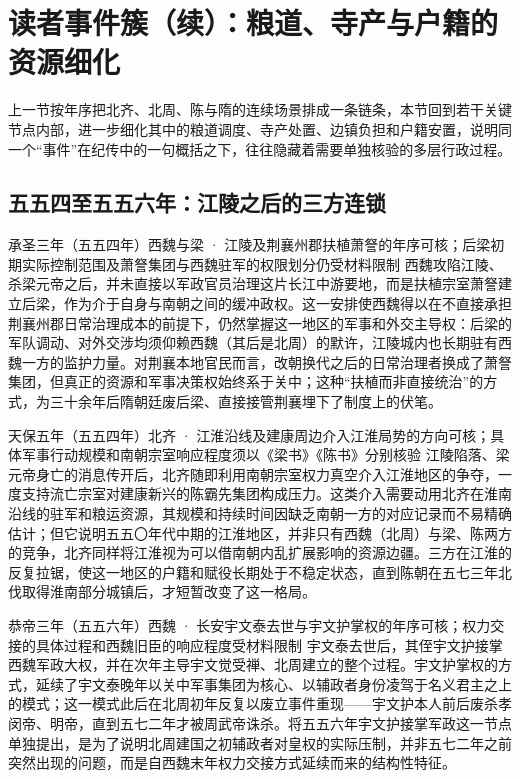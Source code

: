\section{读者事件簇（续）：粮道、寺产与户籍的资源细化}

上一节按年序把北齐、北周、陈与隋的连续场景排成一条链条，本节回到若干关键节点内部，进一步细化其中的粮道调度、寺产处置、边镇负担和户籍安置，说明同一个“事件”在纪传中的一句概括之下，往往隐藏着需要单独核验的多层行政过程。

\subsection{五五四至五五六年：江陵之后的三方连锁}

\begin{event}{}{承圣三年（五五四年）}{西魏与梁 · 江陵及荆襄州郡}{扶植萧詧的年序可核；后梁初期实际控制范围及萧詧集团与西魏驻军的权限划分仍受材料限制}
西魏攻陷江陵、杀梁元帝之后，并未直接以军政官员治理这片长江中游要地，而是扶植宗室萧詧建立后梁，作为介于自身与南朝之间的缓冲政权。这一安排使西魏得以在不直接承担荆襄州郡日常治理成本的前提下，仍然掌握这一地区的军事和外交主导权：后梁的军队调动、对外交涉均须仰赖西魏（其后是北周）的默许，江陵城内也长期驻有西魏一方的监护力量。对荆襄本地官民而言，改朝换代之后的日常治理者换成了萧詧集团，但真正的资源和军事决策权始终系于关中；这种“扶植而非直接统治”的方式，为三十余年后隋朝廷废后梁、直接接管荆襄埋下了制度上的伏笔。
\end{event}

\begin{event}{}{天保五年（五五四年）}{北齐 · 江淮沿线及建康周边}{介入江淮局势的方向可核；具体军事行动规模和南朝宗室响应程度须以《梁书》《陈书》分别核验}
江陵陷落、梁元帝身亡的消息传开后，北齐随即利用南朝宗室权力真空介入江淮地区的争夺，一度支持流亡宗室对建康新兴的陈霸先集团构成压力。这类介入需要动用北齐在淮南沿线的驻军和粮运资源，其规模和持续时间因缺乏南朝一方的对应记录而不易精确估计；但它说明五五〇年代中期的江淮地区，并非只有西魏（北周）与梁、陈两方的竞争，北齐同样将江淮视为可以借南朝内乱扩展影响的资源边疆。三方在江淮的反复拉锯，使这一地区的户籍和赋役长期处于不稳定状态，直到陈朝在五七三年北伐取得淮南部分城镇后，才短暂改变了这一格局。
\end{event}

\begin{event}{}{恭帝三年（五五六年）}{西魏 · 长安}{宇文泰去世与宇文护掌权的年序可核；权力交接的具体过程和西魏旧臣的响应程度受材料限制}
宇文泰去世后，其侄宇文护接掌西魏军政大权，并在次年主导宇文觉受禅、北周建立的整个过程。宇文护掌权的方式，延续了宇文泰晚年以关中军事集团为核心、以辅政者身份凌驾于名义君主之上的模式；这一模式此后在北周初年反复以废立事件重现——宇文护本人前后废杀孝闵帝、明帝，直到五七二年才被周武帝诛杀。将五五六年宇文护接掌军政这一节点单独提出，是为了说明北周建国之初辅政者对皇权的实际压制，并非五七二年之前突然出现的问题，而是自西魏末年权力交接方式延续而来的结构性特征。
\end{event}


